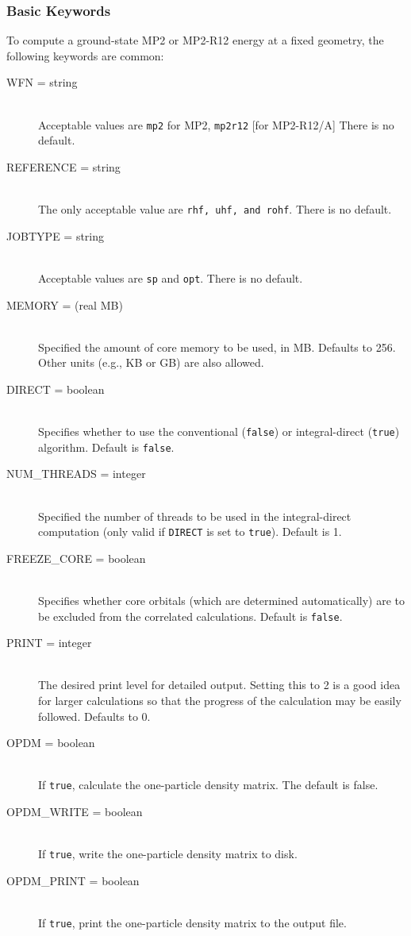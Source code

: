 \subsubsection{Basic Keywords}

To compute a ground-state MP2 or MP2-R12 energy at a fixed geometry,
the following keywords are common:
\begin{description}
\item[WFN = string]\mbox{}\\
Acceptable values are {\tt mp2} for MP2, {\tt mp2r12} [for MP2-R12/A]
There is no default.  
\item[REFERENCE = string]\mbox{}\\
The only acceptable value are {\tt rhf, uhf, and rohf}.
There is no default.
\item[JOBTYPE = string]\mbox{}\\
Acceptable values are {\tt sp} and {\tt opt}.  There is no default.
\item[MEMORY = (real MB)]\mbox{}\\
Specified the amount of core memory to be used, in MB.  Defaults to 256.
Other units (e.g., KB or GB) are also allowed.
\item[DIRECT = boolean]\mbox{}\\
Specifies whether to use the conventional ({\tt false}) or
integral-direct ({\tt true}) algorithm. Default is {\tt false}.
\item[NUM\_THREADS = integer]\mbox{}\\
Specified the number of threads to be used in the integral-direct
computation (only valid if {\tt DIRECT} is set to {\tt true}).
Default is 1.
\item[FREEZE\_CORE = boolean]\mbox{}\\
Specifies whether core orbitals (which are determined automatically) are to
be excluded from the correlated calculations.  Default is {\tt false}.
\item[PRINT = integer]\mbox{}\\
The desired print level for detailed output.  Setting this to 2 is a good
idea for larger calculations so that the progress of the calculation may be
easily followed.  Defaults to 0.
\item[OPDM = boolean]\mbox{}\\
If {\tt true}, calculate the one-particle density matrix.  The default is false.
\item[OPDM\_WRITE = boolean]\mbox{}\\
If {\tt true}, write the one-particle density matrix to disk.
\item[OPDM\_PRINT = boolean]\mbox{}\\
If {\tt true}, print the one-particle density matrix to the output file.
\end{description}

